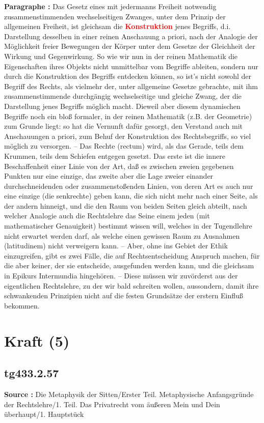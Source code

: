 \documentclass[a4paper,12pt,twoside]{book}
\newcommand{\match}[1]{\textcolor{red}{\textbf{#1}}}
\newcommand{\unnumberedsection}[1]{
	\section*{#1}
	\addcontentsline{toc}{section}{#1}
	\markright{#1}
}
\begin{document}
	\textbf{Paragraphe : }Das Gesetz eines mit jedermanns Freiheit notwendig zusammenstimmenden wechselseitigen Zwanges, unter dem Prinzip der allgemeinen Freiheit, ist gleichsam die \match{Konstruktion} jenes Begriffs, d.i. Darstellung desselben in einer reinen Anschauung a priori, nach der Analogie der Möglichkeit freier Bewegungen der Körper unter dem Gesetze der Gleichheit der Wirkung und Gegenwirkung. So wie wir nun in der reinen Mathematik die Eigenschaften ihres Objekts nicht unmittelbar vom Begriffe ableiten, sondern nur durch die Konstruktion des Begriffs entdecken können, so ist's nicht sowohl der Begriff des Rechts, als vielmehr der, unter allgemeine Gesetze gebrachte, mit ihm zusammenstimmende durchgängig wechselseitige und gleiche Zwang, der die Darstellung jenes Begriffs möglich macht. Dieweil aber diesem dynamischen Begriffe noch ein bloß formaler, in der reinen Mathematik (z.B. der Geometrie) zum Grunde liegt: so hat die Vernunft dafür gesorgt, den Verstand auch mit Anschauungen a priori, zum Behuf der Konstruktion des Rechtsbegriffs, so viel möglich zu versorgen. – Das Rechte (rectum) wird, als das Gerade, teils dem Krummen, teils dem Schiefen entgegen gesetzt. Das erste ist die innere Beschaffenheit einer Linie von der Art, daß es zwischen zweien gegebenen Punkten nur eine einzige, das zweite aber die Lage zweier einander durchschneidenden oder zusammenstoßenden Linien, von deren Art es auch nur eine einzige (die senkrechte) geben kann, die sich nicht mehr nach einer Seite, als der andern hinneigt, und die den Raum von beiden Seiten gleich abteilt, nach welcher Analogie auch die Rechtslehre das Seine einem jeden (mit mathematischer Genauigkeit) bestimmt wissen will, welches in der Tugendlehre nicht erwartet werden darf, als welche einen gewissen Raum zu Ausnahmen (latitudinem) nicht verweigern kann. – Aber, ohne ins Gebiet der Ethik einzugreifen, gibt es zwei Fälle, die auf Rechtsentscheidung  Anspruch machen, für die aber keiner, der sie entscheide, ausgefunden werden kann, und die gleichsam in Epikurs Intermundia hingehören. – Diese müssen wir zuvörderst aus der eigentlichen Rechtslehre, zu der wir bald schreiten wollen, aussondern, damit ihre schwankenden Prinzipien nicht auf die festen Grundsätze der erstern Einfluß bekommen. 
	
	\unnumberedsection{Kraft (5)} 
	\subsection*{tg433.2.57} 
	\textbf{Source : }Die Metaphysik der Sitten/Erster Teil. Metaphysische Anfangsgründe der Rechtslehre/1. Teil. Das Privatrecht vom äußeren Mein und Dein überhaupt/1. Hauptstück\\  
	
\end{document}
